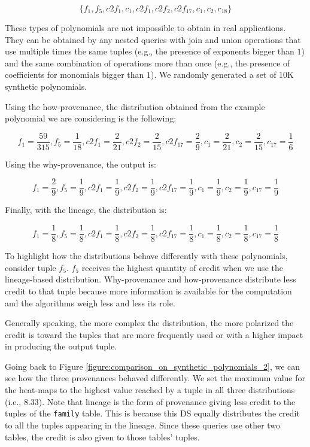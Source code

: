 {\footnotesize
\[
\{f_1, f_5, c2f_1, c_1, c2f_1, c2f_2, c2f_{17}, c_1, c_2, c_{18} \}
\]
 }
 
These types of polynomials are not impossible to obtain in real applications. They can be obtained by any nested queries with join and union operations that use multiple times the same tuples (e.g., the presence of exponents bigger than $1$) and the same combination of operations more than once (e.g., the presence of coefficients for monomials bigger than $1$). 
We randomly generated a set of $10$K synthetic polynomials. 

Using the how-provenance, the distribution obtained from the example polynomial we are considering is the following:

{\footnotesize
\[
f_1 = \frac{59}{315}, f_5 = \frac{1}{18}, c2f_1 = \frac{2}{21}, c2f_2 = \frac{2}{15}, 
c2f_{17}=\frac{2}{9} , c_1 = \frac{2}{21}, c_2 = \frac{2}{15}, c_{17} = \frac{1}{6} 
\]
}

Using the why-provenance, the output is:

{\footnotesize
\[
f_1 = \frac{2}{9}, f_5 = \frac{1}{9}, c2f_1 = \frac{1}{9}, c2f_2 = \frac{1}{9}, 
c2f_{17}=\frac{1}{9} , c_1 = \frac{1}{9}, c_2 = \frac{1}{9}, c_{17} = \frac{1}{9} 
\]
}


Finally, with the lineage, the distribution is:

{\footnotesize
\[
f_1 = \frac{1}{8}, f_5 = \frac{1}{8}, c2f_1 = \frac{1}{8}, c2f_2 = \frac{1}{8}, 
c2f_{17}=\frac{1}{8} , c_1 = \frac{1}{8}, c_2 = \frac{1}{8}, c_{17} = \frac{1}{8} 
\]
}

To highlight how the distributions behave differently with these polynomials, consider tuple $f_5$.
$f_5$ receives the highest quantity of credit when we use the lineage-based distribution. Why-provenance and how-provenance distribute less credit to that tuple because more information is available for the computation and the algorithms weigh less and less its role. 

Generally speaking, the more complex the distribution, the more polarized the credit is toward the tuples that are more frequently used or with a higher impact in producing the output tuple. 

Going back to Figure \ref{figure:comparison_on_synthetic_polynomials_2}, we can see how the three provenances behaved differently. We set the maximum value for the heat-maps to the highest value reached by a tuple in all three distributions (i.e., $8.33$). 
Note that lineage is the form of provenance giving less credit to the tuples of the \texttt{family} table. This is because this DS equally distributes the credit to all the tuples appearing in the lineage. Since these queries use other two tables, the credit is also given to those tables' tuples. 

